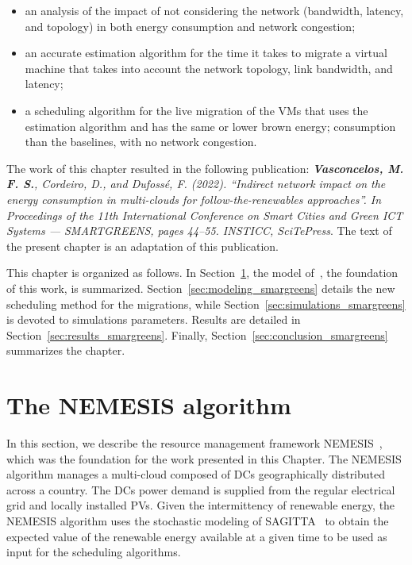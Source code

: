 \begin{itemize}
    \item an analysis of the impact of not considering the network (bandwidth, latency, and topology) in both energy consumption and network congestion;
    \item an accurate estimation algorithm for the time it takes to migrate a virtual machine that takes into account the network topology, link bandwidth, and latency;
    \item a scheduling algorithm for the live migration of the VMs that uses the estimation algorithm and has the same or lower brown energy; consumption than the baselines, with no network congestion.
\end{itemize}
    
The work of this chapter resulted in the following publication:  \textit{\textbf{Vasconcelos, M. F. S.}, Cordeiro, D., and Dufossé, F. (2022). ``Indirect network impact on the energy consumption in multi-clouds for follow-the-renewables approaches''. In Proceedings of the 11th International Conference on Smart Cities and Green ICT Systems — SMARTGREENS, pages 44–55. INSTICC, SciTePress}. The text of the present chapter is an adaptation of this publication.

This chapter is organized as follows. In Section~\ref{sec:nemesis}, the model of~\citet{NEMESIS}, the foundation of this work, is summarized. Section~\ref{sec:modeling_smargreens} details the new scheduling method for the migrations, while Section~\ref{sec:simulations_smargreens} is devoted to simulations parameters. Results are detailed in Section~\ref{sec:results_smargreens}. Finally, Section~\ref{sec:conclusion_smargreens} summarizes the chapter.


\section{The NEMESIS algorithm}
\label{sec:nemesis}

In this section, we describe the resource management framework NEMESIS~\cite{NEMESIS}, which was the foundation for the work presented in this Chapter. The NEMESIS algorithm manages a multi-cloud composed of DCs geographically distributed across a country. The DCs power demand is supplied from the regular electrical grid and locally installed PVs. Given the intermittency of renewable energy, the NEMESIS algorithm uses the stochastic modeling of SAGITTA~\cite{SAGITTA} to obtain the expected value of the renewable energy available at a given time to be used as input for the scheduling algorithms.

